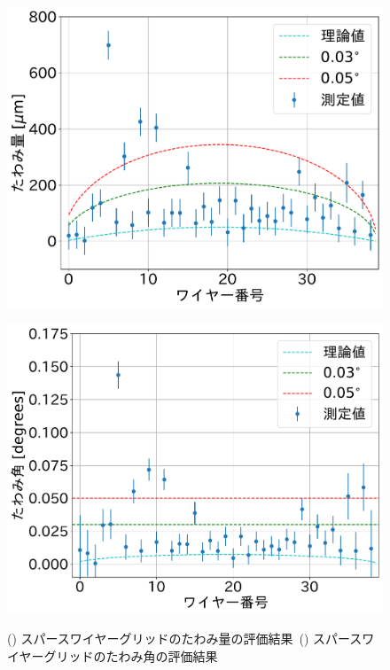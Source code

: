 \documentclass[../../main.tex]{subfiles}
\begin{document}
\begin{figure}[H]
    \begin{minipage}[b]{0.5\hsize}
        \centering
        \includegraphics[width=1.0\textwidth]{wiresag_swg/swg_sag_before.pdf}
        \subcaption{}
        \label{fig:wiresag_swg_sag_result}
    \end{minipage}
    \begin{minipage}[b]{0.5\hsize}
        \centering
        \includegraphics[width=1.0\textwidth]{wiresag_swg/swg_sag_angle_before.pdf}
        \subcaption{}
        \label{fig:wiresag_swg_sag_angle_result}
    \end{minipage}
    \caption{() スパースワイヤーグリッドのたわみ量の評価結果\ 
             () スパースワイヤーグリッドのたわみ角の評価結果}
    \label{fig:wiresag_swg_result}
\end{figure}
\end{document}
